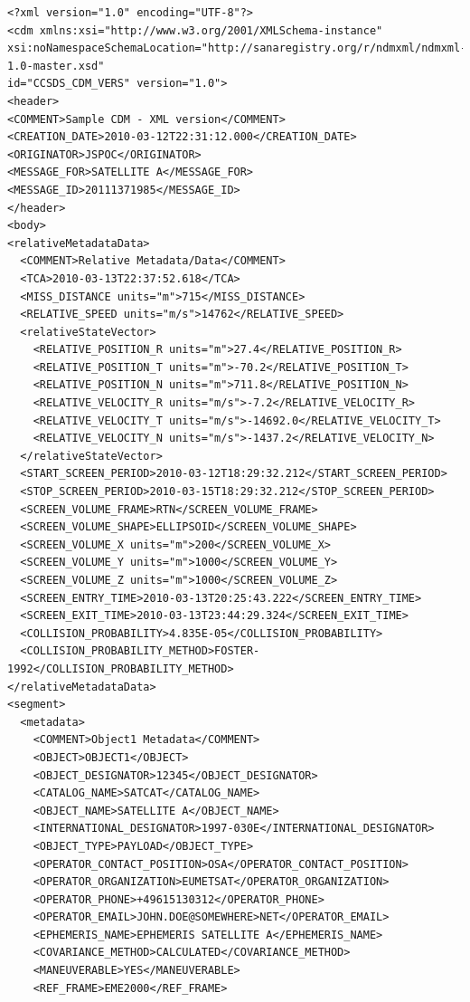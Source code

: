 \lstset{language=XML,basicstyle=\small}
\begin{lstlisting}
<?xml version="1.0" encoding="UTF-8"?>
<cdm xmlns:xsi="http://www.w3.org/2001/XMLSchema-instance"
xsi:noNamespaceSchemaLocation="http://sanaregistry.org/r/ndmxml/ndmxml-1.0-master.xsd"
id="CCSDS_CDM_VERS" version="1.0">
<header>
<COMMENT>Sample CDM - XML version</COMMENT>
<CREATION_DATE>2010-03-12T22:31:12.000</CREATION_DATE>
<ORIGINATOR>JSPOC</ORIGINATOR>
<MESSAGE_FOR>SATELLITE A</MESSAGE_FOR>
<MESSAGE_ID>20111371985</MESSAGE_ID>
</header>
<body>
<relativeMetadataData>
  <COMMENT>Relative Metadata/Data</COMMENT>
  <TCA>2010-03-13T22:37:52.618</TCA>
  <MISS_DISTANCE units="m">715</MISS_DISTANCE>
  <RELATIVE_SPEED units="m/s">14762</RELATIVE_SPEED>
  <relativeStateVector>
    <RELATIVE_POSITION_R units="m">27.4</RELATIVE_POSITION_R>
    <RELATIVE_POSITION_T units="m">-70.2</RELATIVE_POSITION_T>
    <RELATIVE_POSITION_N units="m">711.8</RELATIVE_POSITION_N>
    <RELATIVE_VELOCITY_R units="m/s">-7.2</RELATIVE_VELOCITY_R>
    <RELATIVE_VELOCITY_T units="m/s">-14692.0</RELATIVE_VELOCITY_T>
    <RELATIVE_VELOCITY_N units="m/s">-1437.2</RELATIVE_VELOCITY_N>
  </relativeStateVector>
  <START_SCREEN_PERIOD>2010-03-12T18:29:32.212</START_SCREEN_PERIOD>
  <STOP_SCREEN_PERIOD>2010-03-15T18:29:32.212</STOP_SCREEN_PERIOD>
  <SCREEN_VOLUME_FRAME>RTN</SCREEN_VOLUME_FRAME>
  <SCREEN_VOLUME_SHAPE>ELLIPSOID</SCREEN_VOLUME_SHAPE>
  <SCREEN_VOLUME_X units="m">200</SCREEN_VOLUME_X>
  <SCREEN_VOLUME_Y units="m">1000</SCREEN_VOLUME_Y>
  <SCREEN_VOLUME_Z units="m">1000</SCREEN_VOLUME_Z>
  <SCREEN_ENTRY_TIME>2010-03-13T20:25:43.222</SCREEN_ENTRY_TIME>
  <SCREEN_EXIT_TIME>2010-03-13T23:44:29.324</SCREEN_EXIT_TIME>
  <COLLISION_PROBABILITY>4.835E-05</COLLISION_PROBABILITY>
  <COLLISION_PROBABILITY_METHOD>FOSTER-1992</COLLISION_PROBABILITY_METHOD>
</relativeMetadataData>
<segment>
  <metadata>
    <COMMENT>Object1 Metadata</COMMENT>
    <OBJECT>OBJECT1</OBJECT>
    <OBJECT_DESIGNATOR>12345</OBJECT_DESIGNATOR>
    <CATALOG_NAME>SATCAT</CATALOG_NAME>
    <OBJECT_NAME>SATELLITE A</OBJECT_NAME>
    <INTERNATIONAL_DESIGNATOR>1997-030E</INTERNATIONAL_DESIGNATOR>
    <OBJECT_TYPE>PAYLOAD</OBJECT_TYPE>
    <OPERATOR_CONTACT_POSITION>OSA</OPERATOR_CONTACT_POSITION>
    <OPERATOR_ORGANIZATION>EUMETSAT</OPERATOR_ORGANIZATION>
    <OPERATOR_PHONE>+49615130312</OPERATOR_PHONE>
    <OPERATOR_EMAIL>JOHN.DOE@SOMEWHERE>NET</OPERATOR_EMAIL>
    <EPHEMERIS_NAME>EPHEMERIS SATELLITE A</EPHEMERIS_NAME>
    <COVARIANCE_METHOD>CALCULATED</COVARIANCE_METHOD>
    <MANEUVERABLE>YES</MANEUVERABLE>
    <REF_FRAME>EME2000</REF_FRAME>

\end{lstlisting}
